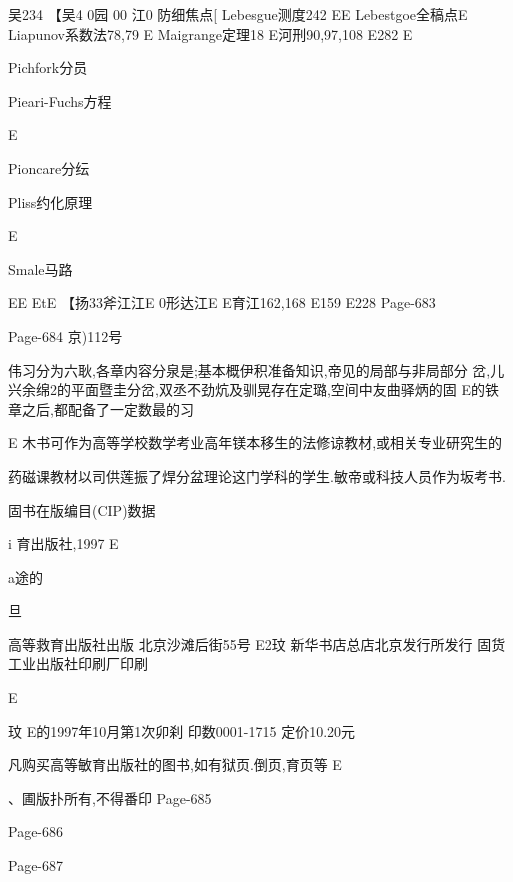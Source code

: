吴234
【吴4
0园
00
江0
防细焦点[
Lebesgue测度242
EE
Lebestgoe全稿点E
Liapunov系数法78,79
E
Maigrange定理18
E河刑90,97,108
E282
E

Pichfork分员

Pieari-Fuchs方程

E

Pioncare分纭

Pliss约化原理

E

Smale马路

EE
EtE
【扬33斧江江E
0形达江E
E育江162,168
E159
E228
Page-683

Page-684
京)112号

伟习分为六耿,各章内容分泉是;基本概伊积准备知识,帝见的局部与非局部分
岔,儿兴余绵2的平面暨圭分岔,双丞不劲炕及驯晃存在定璐,空间中友曲驿炳的固
E的铁章之后,都配备了一定数最的习

E
木书可作为高等学校数学考业高年镁本移生的法修谅教材,或相关专业研究生的

药磁课教材以司供莲振了焊分盆理论这门学科的学生.敏帝或科技人员作为坂考书.

固书在版编目(CIP)数据

i
育出版社,1997
E

a途的

旦

高等救育出版社出版
北京沙滩后街55号
E2玟
新华书店总店北京发行所发行
固货工业出版社印刷厂印刷

E

玟
E的1997年10月第1次卯刹
印数0001-1715
定价10.20元

凡购买高等敏育出版社的图书,如有狱页.倒页,育页等
E

、圃版扑所有,不得番印
Page-685

Page-686

Page-687
